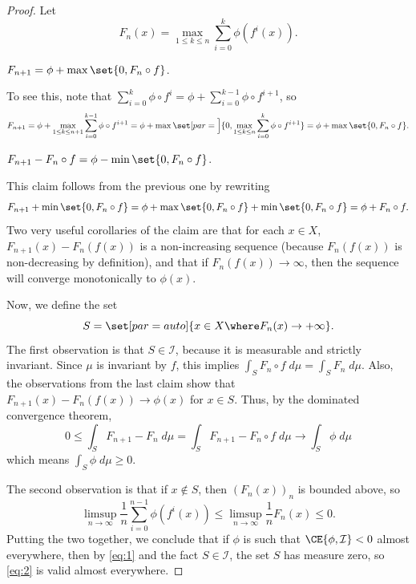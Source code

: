 \documentclass[../main.tex]{subfiles}
\begin{document}
\begin{proof}
  Let \[F_n(x)= \max_{1 \le k \le n} \sum_{i = 0}^{k} \phi(f^i(x)).\]

  \begin{claim}
    \(F_{n + 1} = \phi + \max\set{0, F_n \circ f}\).
  \end{claim}
  To see this, note that \(\sum_{i = 0}^{k} \phi \circ f^i = \phi + \sum_{i = 0}^{k - 1} \phi \circ f^{i + 1}\), so
  \[F_{n + 1}
    = \phi + \max_{1 \le k \le n + 1}\sum_{i = 0}^{k - 1} \phi \circ f^{i + 1}
    = \phi + \max\set[par = \Big]{0,\max_{1 \le k \le n}\sum_{i = 0}^{k} \phi \circ f^{i + 1}}
    = \phi + \max \set{0,F_n \circ f}.
  \]

  \begin{claim}
    \(F_{n + 1} - F_n \circ f = \phi - \min\set{0, F_n \circ f}\).
  \end{claim}
  This claim follows from the previous one by rewriting
  \begin{align*}
    F_{n + 1} + \min\set{0, F_n \circ f} = \phi + \max\set{0, F_n \circ f} + \min\set{0, F_n \circ f} = \phi + F_n \circ f.
  \end{align*}
  Two very useful corollaries of the claim are that for each \(x \in X\), \(F_{n + 1}(x) - F_n(f(x))\) is a non-increasing sequence (because \(F_n(f(x))\) is non-decreasing by definition), and that if \(F_n(f(x)) \to \infty\), then the sequence will converge monotonically to \(\phi(x)\).

  Now, we define the set
  \begin{equation*}
    S = \set[par = auto]{x \in X \where F_n(x) \to + \infty}.
  \end{equation*}
  The first observation is that \(S \in \mathcal{I}\), because it is measurable and strictly invariant. Since \(\mu\) is invariant by \(f\), this implies \(\int_S F_n \circ f\;d\mu = \int_S F_n\;d\mu\). Also, the observations from the last claim show that \(F_{n + 1}(x) - F_n(f(x)) \to \phi(x)\) for \(x \in S\). Thus, by the dominated convergence theorem,
  \begin{equation}\label{eq:1}
    0 \le \int_S F_{n + 1} - F_n\;d\mu = \int_S F_{n + 1} - F_n \circ f\;d\mu \to \int_S \phi\;d\mu
  \end{equation}
  which means \(\int_S \phi\;d\mu \ge 0\).

  The second observation is that if \(x \notin S\), then \((F_n(x))_n\) is bounded above, so
  \begin{equation}\label{eq:2}
    \limsup_{n \to \infty} \frac{1}{n}\sum_{i = 0}^{n - 1} \phi(f^i(x)) \le \limsup_{n \to \infty} \frac{1}{n}F_n(x) \le 0.
  \end{equation}
  Putting the two together, we conclude that if \(\phi\) is such that \(\CE{\phi, \mathcal{I}} < 0\) almost everywhere, then by  \cref{eq:1} and the fact \(S \in \mathcal{I}\), the set \(S\) has measure zero, so  \cref{eq:2} is valid almost everywhere.


\end{proof}
\end{document}
